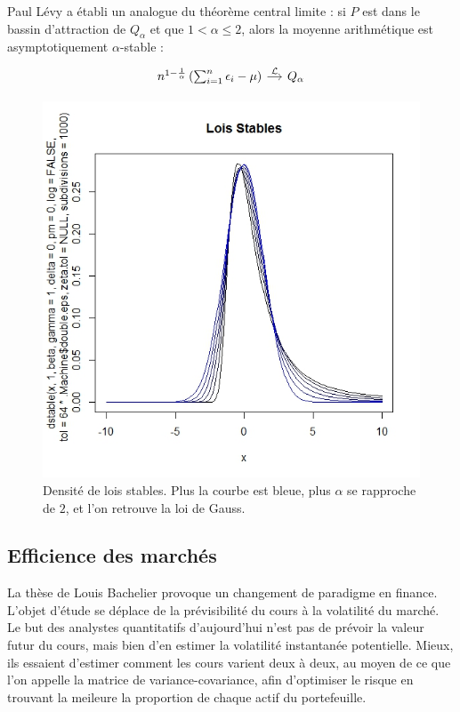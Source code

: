 \documentclass{article}
\begin{document}
Paul Lévy a établi un analogue du théorème central limite : si $P$ est dans le bassin d'attraction de $Q_\alpha$ et que $1<\alpha\leq2$, alors la moyenne arithmétique est asymptotiquement $\alpha$-stable :
\[
\begin{tikzcd}[column sep = small]
n^{1-\frac{1}{\alpha}}\left(\sum_{i=1}^n \epsilon_i-\mu\right)\arrow{r}{\mathcal L} & Q_\alpha
\end{tikzcd}\]

\begin{figure}[!h]\centering
\includegraphics[scale=0.4]{Stables.jpeg}
\caption{Densité de lois stables. Plus la courbe est bleue, plus $\alpha$ se rapproche de $2$, et l'on retrouve la loi de Gauss.}
\label{fig:Stables}
\end{figure}

\subsection{Efficience des marchés}

La thèse de Louis Bachelier provoque un changement de paradigme en finance. L'objet d'étude se déplace de la prévisibilité du cours à la volatilité du marché. Le but des analystes quantitatifs d'aujourd'hui n'est pas de prévoir la valeur futur du cours, mais bien d'en estimer la volatilité instantanée potentielle. Mieux, ils essaient d'estimer comment les cours varient deux à deux, au moyen de ce que l'on appelle la matrice de variance-covariance, afin d'optimiser le risque en trouvant la meileure la proportion de chaque actif du portefeuille.\\
\end{document}
